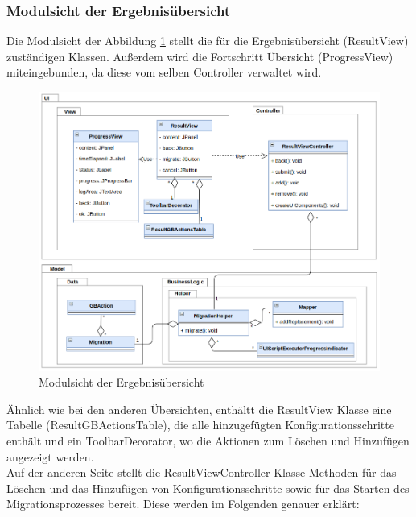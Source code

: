 	
	
	\subsubsection{Modulsicht der Ergebnisübersicht}
	Die Modulsicht der Abbildung \ref{img:modulsicht-resul} stellt die für die Ergebnisübersicht (ResultView) zuständigen Klassen. Außerdem wird die Fortschritt Übersicht (ProgressView) miteingebunden, da diese vom selben Controller verwaltet wird.
	\begin{figure}[H]
		\centering
		\includegraphics[width=\textwidth]{images/sichten/modulsicht-result}
		\caption{Modulsicht der Ergebnisübersicht}
		\label{img:modulsicht-resul}
	\end{figure}
	Ähnlich wie bei den anderen Übersichten, enthältt die ResultView Klasse eine Tabelle (ResultGBActionsTable), die alle hinzugefügten Konfigurationsschritte enthält und ein ToolbarDecorator, wo die Aktionen zum Löschen und Hinzufügen angezeigt werden. \\
	Auf der anderen Seite stellt die ResultViewController Klasse Methoden für das Löschen und das Hinzufügen von Konfigurationsschritte sowie für das Starten des Migrationsprozesses bereit. Diese werden im Folgenden genauer erklärt:
